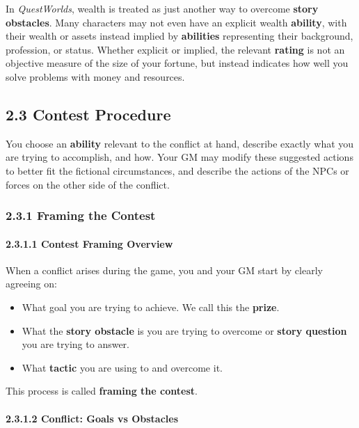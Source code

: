 \documentclass[
  11pt,
]{article}
\providecommand{\tightlist}{%
  \setlength{\itemsep}{0pt}\setlength{\parskip}{0pt}}
\begin{document}
In \emph{QuestWorlds}, wealth is treated as just another way to overcome
\textbf{story obstacles}. Many characters may not even have an explicit
wealth \textbf{ability}, with their wealth or assets instead implied by
\textbf{abilities} representing their background, profession, or status.
Whether explicit or implied, the relevant \textbf{rating} is not an
objective measure of the size of your fortune, but instead indicates how
well you solve problems with money and resources.

\hypertarget{contest-procedure}{%
\subsection{2.3 Contest Procedure}\label{contest-procedure}}

You choose an \textbf{ability} relevant to the conflict at hand,
describe exactly what you are trying to accomplish, and how. Your GM may
modify these suggested actions to better fit the fictional
circumstances, and describe the actions of the NPCs or forces on the
other side of the conflict.

\hypertarget{framing-the-contest}{%
\subsubsection{2.3.1 Framing the Contest}\label{framing-the-contest}}

\hypertarget{contest-framing-overview}{%
\paragraph{2.3.1.1 Contest Framing
Overview}\label{contest-framing-overview}}

When a conflict arises during the game, you and your GM start by clearly
agreeing on:

\begin{itemize}
\tightlist
\item
  What goal you are trying to achieve. We call this the \textbf{prize}.
\item
  What the \textbf{story obstacle} is you are trying to overcome or
  \textbf{story question} you are trying to answer.
\item
  What \textbf{tactic} you are using to and overcome it.
\end{itemize}

This process is called \textbf{framing the contest}.

\hypertarget{conflict-goals-vs-obstacles}{%
\paragraph{2.3.1.2 Conflict: Goals vs
Obstacles}\label{conflict-goals-vs-obstacles}}
\end{document}
